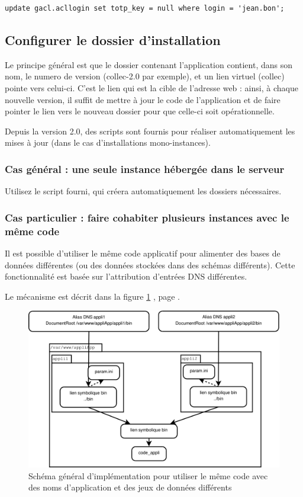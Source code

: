 \begin{lstlisting}
update gacl.acllogin set totp_key = null where login = 'jean.bon';
\end{lstlisting}

\subsection{Configurer le dossier d'installation}

Le principe général est que le dossier contenant l'application contient, dans son nom, le numero de version (collec-2.0 par exemple), et un lien virtuel (collec) pointe vers celui-ci. C'est le lien qui est la cible de l'adresse web : ainsi, à chaque nouvelle version, il suffit de mettre à jour le code de l'application et de faire pointer le lien vers le nouveau dossier pour que celle-ci soit opérationnelle.

Depuis la version 2.0, des scripts sont fournis pour réaliser automatiquement les mises à jour (dans le cas d'installations mono-instances).

\subsubsection{Cas général : une seule instance hébergée dans le serveur}

Utilisez le script fourni, qui créera automatiquement les dossiers nécessaires. 


\subsubsection{Cas particulier : faire cohabiter plusieurs instances avec le même code}
\label{dnsmultiple}
Il est possible d'utiliser le même code applicatif pour alimenter des bases de données différentes (ou des données stockées dans des schémas différents). Cette fonctionnalité est basée sur l'attribution d'entrées DNS différentes. 

Le mécanisme est décrit dans la figure \ref{dnsmultipleschema} \textit{}, page \pageref{dnsmultipleschema}.

\begin{figure}[H]
\includegraphics[width=\linewidth]{images/dnsmultiple}
\caption{\label{dnsmultipleschema}Schéma général d’implémentation pour utiliser le même code avec des noms d’application et des jeux de données différents}
\end{figure}

